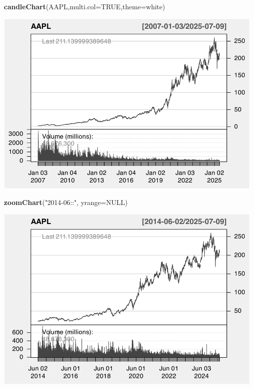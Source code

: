 \documentclass[]{ctexbook}
\newenvironment{Shaded}{\begin{snugshade}}{\end{snugshade}}
\newcommand{\AttributeTok}[1]{\textcolor[rgb]{0.13,0.29,0.53}{#1}}
\newcommand{\ConstantTok}[1]{\textcolor[rgb]{0.56,0.35,0.01}{#1}}
\newcommand{\FunctionTok}[1]{\textcolor[rgb]{0.13,0.29,0.53}{\textbf{#1}}}
\newcommand{\NormalTok}[1]{#1}
\newcommand{\StringTok}[1]{\textcolor[rgb]{0.31,0.60,0.02}{#1}}
\begin{document}
\begin{Shaded}
\begin{Highlighting}[]
\FunctionTok{candleChart}\NormalTok{(AAPL,}\AttributeTok{multi.col=}\ConstantTok{TRUE}\NormalTok{,}\AttributeTok{theme=}\StringTok{\textquotesingle{}white\textquotesingle{}}\NormalTok{) }
\end{Highlighting}
\end{Shaded}

\includegraphics[width=0.9\linewidth]{quantmod_files/figure-latex/zoomMonth-1}

\begin{Shaded}
\begin{Highlighting}[]
\FunctionTok{zoomChart}\NormalTok{(}\StringTok{"2014{-}06::"}\NormalTok{, }\AttributeTok{yrange=}\ConstantTok{NULL}\NormalTok{)}
\end{Highlighting}
\end{Shaded}

\includegraphics[width=0.9\linewidth]{quantmod_files/figure-latex/zoomMonth-2}
\end{document}
